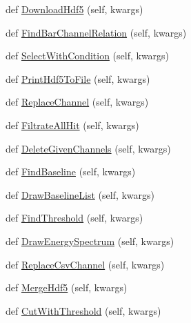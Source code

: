 \begin{DoxyCompactItemize}
\item 
def \hyperlink{classMIS_1_1DataFactory_1_1DataManager_1_1DataManager_a8fb1b4a388c4c73b8cbde76e1b10659c}{Download\+Hdf5} (self, kwargs)
\item 
def \hyperlink{classMIS_1_1DataFactory_1_1DataManager_1_1DataManager_a59675972a2779a9d74f4cb51983e58f5}{Find\+Bar\+Channel\+Relation} (self, kwargs)
\item 
def \hyperlink{classMIS_1_1DataFactory_1_1DataManager_1_1DataManager_a6979a881ed25f7e2869fa7c2e6712698}{Select\+With\+Condition} (self, kwargs)
\item 
def \hyperlink{classMIS_1_1DataFactory_1_1DataManager_1_1DataManager_a9ce637c3da9b07ce3e8c62d543051bd6}{Print\+Hdf5\+To\+File} (self, kwargs)
\item 
def \hyperlink{classMIS_1_1DataFactory_1_1DataManager_1_1DataManager_ab2e1bdcab18235398654af056ad7ff59}{Replace\+Channel} (self, kwargs)
\item 
def \hyperlink{classMIS_1_1DataFactory_1_1DataManager_1_1DataManager_a8828518f01b49070ed6b453d7eca6f6e}{Filtrate\+All\+Hit} (self, kwargs)
\item 
def \hyperlink{classMIS_1_1DataFactory_1_1DataManager_1_1DataManager_a46c6ec4d91a216b3d43dd309691c4d21}{Delete\+Given\+Channels} (self, kwargs)
\item 
def \hyperlink{classMIS_1_1DataFactory_1_1DataManager_1_1DataManager_aa7b61ca8b7cb33b0786888c28456de36}{Find\+Baseline} (self, kwargs)
\item 
def \hyperlink{classMIS_1_1DataFactory_1_1DataManager_1_1DataManager_af16e88fd1cd8676b4eac90887a829a9d}{Draw\+Baseline\+List} (self, kwargs)
\item 
def \hyperlink{classMIS_1_1DataFactory_1_1DataManager_1_1DataManager_ad17d5448bcc9b53d7fe26b24e0672147}{Find\+Threshold} (self, kwargs)
\item 
def \hyperlink{classMIS_1_1DataFactory_1_1DataManager_1_1DataManager_adccd45285e6002b8f652b475a1b601a0}{Draw\+Energy\+Spectrum} (self, kwargs)
\item 
def \hyperlink{classMIS_1_1DataFactory_1_1DataManager_1_1DataManager_a32e02ddea8bc393aeecf6c6cdfc66c00}{Replace\+Csv\+Channel} (self, kwargs)
\item 
def \hyperlink{classMIS_1_1DataFactory_1_1DataManager_1_1DataManager_a373b898ad5c6eb521673ba5ca1576c0f}{Merge\+Hdf5} (self, kwargs)
\item 
def \hyperlink{classMIS_1_1DataFactory_1_1DataManager_1_1DataManager_a78a17922f822b340653450a8cdcdd278}{Cut\+With\+Threshold} (self, kwargs)

\end{DoxyCompactItemize}
